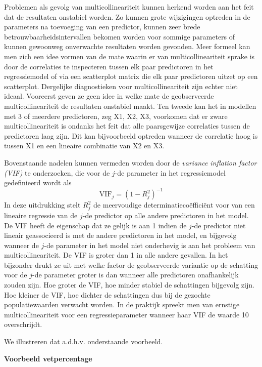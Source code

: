 \documentclass[12pt,dutch,coursenotes]{book}
\theoremstyle{definition}
\theoremstyle{definition}
\theoremstyle{definition}
\theoremstyle{remark}
\begin{document}
Problemen als gevolg van multicollineariteit kunnen herkend worden aan
het feit dat de resultaten onstabiel worden. Zo kunnen grote wijzigingen
optreden in de parameters na toevoeging van een predictor, kunnen zeer
brede betrouwbaarheidsintervallen bekomen worden voor sommige parameters
of kunnen gewoonweg onverwachte resultaten worden gevonden. Meer formeel
kan men zich een idee vormen van de mate waarin er van
multicollineariteit sprake is door de correlaties te inspecteren tussen
elk paar predictoren in het regressiemodel of via een scatterplot matrix
die elk paar predictoren uitzet op een scatterplot. Dergelijke
diagnostieken voor multicollineariteit zijn echter niet ideaal.
Vooreerst geven ze geen idee in welke mate de geobserveerde
multicollineariteit de resultaten onstabiel maakt. Ten tweede kan het in
modellen met 3 of meerdere predictoren, zeg X1, X2, X3, voorkomen dat er
zware multicollineariteit is ondanks het feit dat alle paarsgewijze
correlaties tussen de predictoren laag zijn. Dit kan bijvoorbeeld
optreden wanneer de correlatie hoog is tussen X1 en een lineaire
combinatie van X2 en X3.

Bovenstaande nadelen kunnen vermeden worden door de
\textit{variance inflation factor (VIF)} te onderzoeken, die voor de
\(j\)-de parameter in het regressiemodel gedefinieerd wordt als
\[\textrm{VIF}_j=\left(1-R_j^2\right)^{-1}\] In deze uitdrukking stelt
\(R_j^2\) de meervoudige determinatiecoëfficiënt voor van een lineaire
regressie van de \(j\)-de predictor op alle andere predictoren in het
model. De VIF heeft de eigenschap dat ze gelijk is aan 1 indien de
\(j\)-de predictor niet lineair geassocieerd is met de andere
predictoren in het model, en bijgevolg wanneer de \(j\)-de parameter in
het model niet onderhevig is aan het probleem van multicollineariteit.
De VIF is groter dan 1 in alle andere gevallen. In het bijzonder drukt
ze uit met welke factor de geobserveerde variantie op de schatting voor
de \(j\)-de parameter groter is dan wanneer alle predictoren
onafhankelijk zouden zijn. Hoe groter de VIF, hoe minder stabiel de
schattingen bijgevolg zijn. Hoe kleiner de VIF, hoe dichter de
schattingen dus bij de gezochte populatiewaarden verwacht worden. In de
praktijk spreekt men van ernstige multicollineariteit voor een
regressieparameter wanneer haar VIF de waarde 10 overschrijdt.

We illustreren dat a.d.h.v. onderstaande voorbeeld.

\textbf{Voorbeeld vetpercentage}
\end{document}
